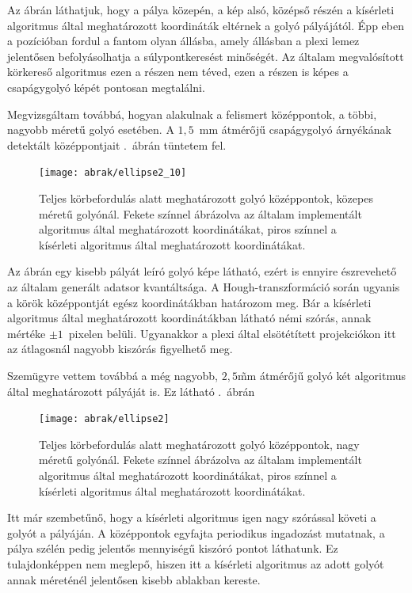 \documentclass[a4paper,12pt]{article}
\begin{document}
 Az ábrán láthatjuk, hogy a pálya közepén, a kép alsó, középső részén a kísérleti algoritmus által meghatározott koordináták eltérnek a golyó pályájától. Épp eben a pozícióban fordul a fantom olyan állásba, amely állásban a plexi lemez jelentősen befolyásolhatja a súlypontkeresést minőségét. Az általam megvalósított körkereső algoritmus ezen a részen nem téved, ezen a részen is képes a csapágygolyó képét pontosan megtalálni.
 
 
 Megvizsgáltam továbbá, hogyan alakulnak a felismert középpontok, a többi, nagyobb méretű golyó esetében. A $1,\!5$~mm átmérőjű csapágygolyó árnyékának detektált középpontjait .~ábrán tüntetem fel. 




\begin{figure}[htbp]
\center
\texttt{[image: abrak/ellipse2\_10]}
\caption{Teljes körbefordulás alatt meghatározott golyó középpontok, közepes méretű golyónál. Fekete színnel ábrázolva az általam implementált algoritmus által meghatározott koordinátákat, piros színnel a kísérleti algoritmus által meghatározott koordinátákat.}
\label{fig:ellipses2_10}
\end{figure}




Az ábrán egy kisebb pályát leíró golyó képe látható, ezért is ennyire észrevehető az általam generált adatsor kvantáltsága. A Hough-transzformáció során ugyanis a körök középpontját egész koordinátákban határozom meg. Bár a kísérleti algoritmus által meghatározott koordinátákban látható némi szórás, annak mértéke $\pm 1$~pixelen belüli. Ugyanakkor a plexi által elsötétített projekciókon itt az átlagosnál nagyobb kiszórás figyelhető meg.


Szemügyre vettem továbbá a  még nagyobb, $2,\!5$\~mm átmérőjű golyó két algoritmus által meghatározott pályáját is. Ez látható  .~ábrán




\begin{figure}[htbp]
\center
\texttt{[image: abrak/ellipse2]}
\caption{Teljes körbefordulás alatt meghatározott golyó középpontok, nagy méretű golyónál. Fekete színnel ábrázolva az általam implementált algoritmus által meghatározott koordinátákat, piros színnel a kísérleti algoritmus által meghatározott koordinátákat.}
\label{fig:ellipses2}
\end{figure}



Itt már szembetűnő, hogy a kísérleti algoritmus igen nagy szórással követi a  golyót a pályáján. A középpontok egyfajta periodikus ingadozást mutatnak, a pálya szélén pedig jelentős mennyiségű kiszóró pontot láthatunk. Ez tulajdonképpen nem meglepő, hiszen itt a kísérleti algoritmus az adott golyót annak méreténél jelentősen kisebb ablakban kereste. 
\end{document}
